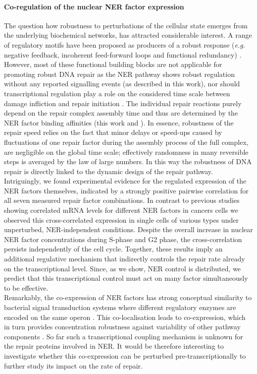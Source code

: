 \paragraph{Co-regulation of the nuclear NER factor expression}    The question how robustness to perturbations of the cellular state emerges from the underlying biochemical networks, has attracted considerable interest. A range of regulatory motifs have been proposed as producers of a robust response (\textit{e.g.} negative feedback, incoherent feed-forward loops and functional redundancy) \cite{Alon2007,Bleris2011,Yi2000,Manuscript2011}. However, most of these functional building blocks are not applicable for promoting robust DNA repair as the NER pathway shows robust regulation without any reported signalling events (as described in this work), nor should transcriptional regulation play a role on the considered time scale between damage infliction and repair initiation \cite{Mone2001}. The individual repair reactions purely depend on the repair complex assembly time and thus are determined by the NER factor binding affinities (this work and \cite{Luijsterburg2010}). In essence, robustness of the repair speed relies on the fact that minor delays or speed-ups caused by fluctuations of one repair factor during the assembly process of the full complex, are negligible on the global time scale; effectively randomness in many reversible steps is averaged by the law of large numbers. In this way the robustness of DNA repair is directly linked to the dynamic design of the repair pathway.\\     
Intriguingly, we found experimental evidence for the regulated expression of the NER factors themselves, indicated by a strongly positive pairwise correlation for all seven measured repair factor combinations. In contrast to previous studies showing correlated mRNA levels for different NER factors in cancers cells \cite{Damia1998,Cheng2000} we observed this cross-correlated expression in single cells of various types under unperturbed, NER-independent conditions. Despite the overall increase in nuclear NER factor concentrations during S-phase and G2 phase, the cross-correlation persists independently of the cell cycle. Together, these results imply an additional regulative mechanism that indirectly controls the repair rate already on the transcriptional level. Since, as we show, NER control is distributed, we predict that this transcriptional control must act on many factor simultaneously to be effective.\\
Remarkably, the co-expression of NER factors has strong conceptual similarity to bacterial signal transduction systems where different regulatory enzymes are encoded on the same operon \cite{Kollmann2005,Lovdok2009}. This co-localisation leads to co-expression, which in turn provides concentration robustness against variability of other pathway components \cite{Bluthgen2013}. So far such a transcriptional coupling mechanism is unknown for the repair proteins involved in NER. It would be therefore interesting to investigate whether this co-expression can be perturbed pre-transcriptionally to further study its impact on the rate of repair. 

